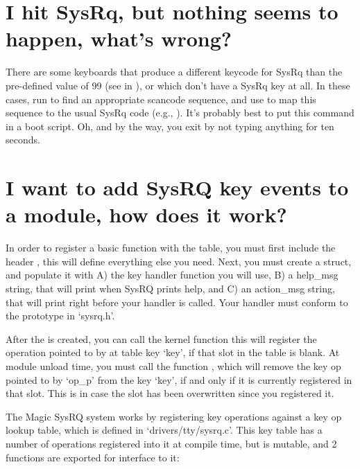 \documentclass[a4paper,8pt,english]{sphinxmanual}
\begin{document}
\section{I hit SysRq, but nothing seems to happen, what's wrong?}
\label{admin-guide/sysrq:i-hit-sysrq-but-nothing-seems-to-happen-what-s-wrong}
There are some keyboards that produce a different keycode for SysRq than the
pre-defined value of 99
(see  in ), or
which don't have a SysRq key at all. In these cases, run  to find
an appropriate scancode sequence, and use  to map
this sequence to the usual SysRq code (e.g., ). It's
probably best to put this command in a boot script. Oh, and by the way, you
exit  by not typing anything for ten seconds.


\section{I want to add SysRQ key events to a module, how does it work?}
\label{admin-guide/sysrq:i-want-to-add-sysrq-key-events-to-a-module-how-does-it-work}
In order to register a basic function with the table, you must first include
the header , this will define everything else you need.
Next, you must create a  struct, and populate it with A) the key
handler function you will use, B) a help\_msg string, that will print when SysRQ
prints help, and C) an action\_msg string, that will print right before your
handler is called. Your handler must conform to the prototype in `sysrq.h'.

After the  is created, you can call the kernel function
 this will
register the operation pointed to by  at table key `key',
if that slot in the table is blank. At module unload time, you must call
the function , which
will remove the key op pointed to by `op\_p' from the key `key', if and only if
it is currently registered in that slot. This is in case the slot has been
overwritten since you registered it.

The Magic SysRQ system works by registering key operations against a key op
lookup table, which is defined in `drivers/tty/sysrq.c'. This key table has
a number of operations registered into it at compile time, but is mutable,
and 2 functions are exported for interface to it:
\end{document}
